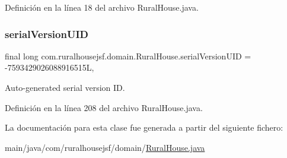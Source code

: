 Definición en la línea 18 del archivo Rural\+House.\+java.

\mbox{\label{classcom_1_1ruralhousejsf_1_1domain_1_1_rural_house_a2ef1095a366b8e08e491c70cd421b907}} 
\subsubsection{\texorpdfstring{serialVersionUID}{serialVersionUID}}
{\footnotesize\ttfamily final long com.\+ruralhousejsf.\+domain.\+Rural\+House.\+serial\+Version\+U\+ID = -\/7593429026088916515L\hspace{0.3cm}{\ttfamily [static]}, {\ttfamily [private]}}



Auto-\/generated serial version ID. 



Definición en la línea 208 del archivo Rural\+House.\+java.



La documentación para esta clase fue generada a partir del siguiente fichero\+:\begin{DoxyCompactItemize}
\item 
main/java/com/ruralhousejsf/domain/\mbox{\hyperlink{_rural_house_8java}{Rural\+House.\+java}}\end{DoxyCompactItemize}
